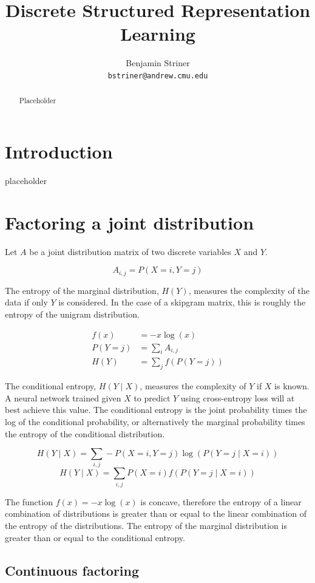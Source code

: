 \documentclass[11pt,letterpaper]{article}
\title{Discrete Structured Representation Learning}
\author{Benjamin Striner \\
  {\tt bstriner@andrew.cmu.edu} \\}
\date{}
\begin{document}
\maketitle
\begin{abstract}
  Placeholder
\end{abstract}

\section{Introduction}

placeholder

\section{Factoring a joint distribution}

Let $A$ be a joint distribution matrix of two discrete variables $X$ and $Y$.

$$A_{i,j}=P(X=i, Y=j)$$

The entropy of the marginal distribution, $H(Y)$, measures the complexity of the data if only $Y$ is considered. In the case of a skipgram matrix, this is roughly the entropy of the unigram distribution.

\begin{align*}
f(x) &= -x \log(x) \\
P(Y=j) &= \sum_i A_{i, j} \\
H(Y) &=  \sum_j f(P(Y=j))
\end{align*}

The conditional entropy, $H(Y \mid X)$, measures the complexity of $Y$ if $X$ is known. A neural network trained given $X$ to predict $Y$ using cross-entropy loss will at best achieve this value. The conditional entropy is the joint probability times the log of the conditional probability, or alternatively the marginal probability times the entropy of the conditional distribution.

\setlength{\thinmuskip}{0mu}
\setlength{\medmuskip}{0mu}
\setlength{\thickmuskip}{0mu} 
$$H(Y \mid X)=\sum_{i,j} - P(X=i, Y=j) \log(P(Y=j \mid X=i)) $$
$$H(Y \mid X)= \sum_{i,j}  P(X=i) f(P(Y=j \mid X=i))$$

The function $f(x)=-x \log(x)$ is concave, therefore the entropy of a linear combination of distributions is greater than or equal to the linear combination of the entropy of the distributions. The entropy of the marginal distribution is greater than or equal to the conditional entropy.

\subsection{Continuous factoring}
\end{document}
